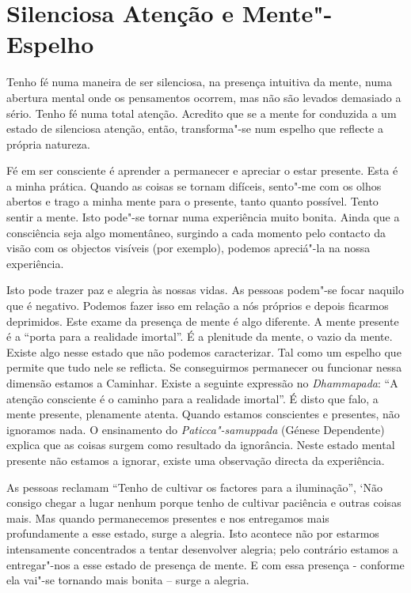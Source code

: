 \chapter{Silenciosa Atenção e Mente"-Espelho}

Tenho fé numa maneira de ser silenciosa, na presença intuitiva da mente, numa
abertura mental onde os pensamentos ocorrem, mas não são levados demasiado a
sério. Tenho fé numa total atenção. Acredito que se a mente for conduzida a um
estado de silenciosa atenção, então, transforma"-se num espelho que reflecte a
própria natureza.

Fé em ser consciente é aprender a permanecer e apreciar o estar
presente. Esta é a minha prática. Quando as coisas se tornam difíceis,
sento"-me com os olhos abertos e trago a minha mente para o presente,
tanto quanto possível. Tento sentir a mente. Isto pode"-se tornar numa
experiência muito bonita. Ainda que a consciência seja algo momentâneo,
surgindo a cada momento pelo contacto da visão com os objectos visíveis
(por exemplo), podemos apreciá"-la na nossa experiência.

Isto pode trazer paz e alegria às nossas vidas. As pessoas podem"-se
focar naquilo que é negativo. Podemos fazer isso em relação a nós
próprios e depois ficarmos deprimidos. Este exame da presença de mente é
algo diferente. A mente presente é a ``porta para a realidade imortal''.
É a plenitude da mente, o vazio da mente. Existe algo nesse estado que
não podemos caracterizar. Tal como um espelho que permite que tudo nele
se reflicta. Se conseguirmos permanecer ou funcionar nessa dimensão
estamos a Caminhar. Existe a seguinte expressão no \emph{Dhammapada}:
``A atenção consciente é o caminho para a realidade imortal''. É disto
que falo, a mente presente, plenamente atenta. Quando estamos
conscientes e presentes, não ignoramos nada. O ensinamento do
\emph{Paticca"-samuppada} (Génese Dependente) explica que as coisas
surgem como resultado da ignorância. Neste estado mental presente não
estamos a ignorar, existe uma observação directa da experiência.

As pessoas reclamam ``Tenho de cultivar os factores para a iluminação'',
`Não consigo chegar a lugar nenhum porque tenho de cultivar paciência e
outras coisas mais. Mas quando permanecemos presentes e nos entregamos
mais profundamente a esse estado, surge a alegria. Isto acontece não por
estarmos intensamente concentrados a tentar desenvolver alegria; pelo
contrário estamos a entregar"-nos a esse estado de presença de mente. E
com essa presença - conforme ela vai"-se tornando mais bonita -- surge a
alegria.

